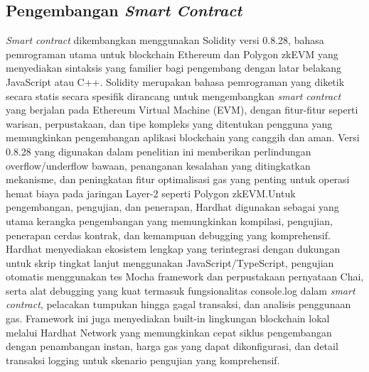 \subsection{Pengembangan \emph{Smart Contract}}
\emph{Smart contract} dikembangkan menggunakan Solidity versi 0.8.28, bahasa
pemrograman utama untuk blockchain Ethereum dan Polygon zkEVM yang menyediakan
sintaksis yang familier bagi pengembang dengan latar belakang JavaScript atau
C++. Solidity merupakan bahasa pemrograman yang diketik secara statis secara
spesifik dirancang untuk mengembangkan \emph{smart contract} yang berjalan pada
Ethereum Virtual Machine (EVM), dengan fitur-fitur seperti warisan,
perpustakaan, dan tipe kompleks yang ditentukan pengguna yang memungkinkan
pengembangan aplikasi blockchain yang canggih dan aman. Versi 0.8.28 yang
digunakan dalam penelitian ini memberikan perlindungan overflow/underflow
bawaan, penanganan kesalahan yang ditingkatkan mekanisme, dan peningkatan fitur
optimalisasi gas yang penting untuk operasi hemat biaya pada jaringan Layer-2
seperti Polygon zkEVM.Untuk pengembangan, pengujian, dan penerapan, Hardhat
digunakan sebagai yang utama kerangka pengembangan yang memungkinkan kompilasi,
pengujian, penerapan cerdas kontrak, dan kemampuan debugging yang komprehensif.
Hardhat menyediakan ekosistem lengkap yang terintegrasi dengan dukungan untuk
skrip tingkat lanjut menggunakan JavaScript/TypeScript, pengujian otomatis
menggunakan tes Mocha framework dan perpustakaan pernyataan Chai, serta alat
debugging yang kuat termasuk fungsionalitas console.log dalam \emph{smart contract},
pelacakan tumpukan hingga gagal transaksi, dan analisis penggunaan gas.
Framework ini juga menyediakan built-in lingkungan blockchain lokal melalui
Hardhat Network yang memungkinkan cepat siklus pengembangan dengan penambangan
instan, harga gas yang dapat dikonfigurasi, dan detail transaksi logging untuk
skenario pengujian yang komprehensif.

